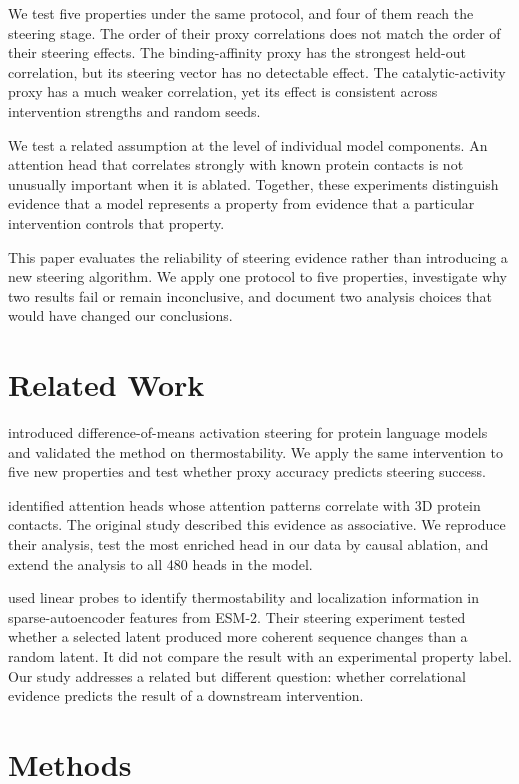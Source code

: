 \documentclass{article}
\begin{document}
We test five properties under the same protocol, and four of them reach
the steering stage. The order of their proxy correlations does not match
the order of their steering effects. The binding-affinity proxy has the
strongest held-out correlation, but its steering vector has no
detectable effect. The catalytic-activity proxy has a much weaker
correlation, yet its effect is consistent across intervention strengths
and random seeds.

We test a related assumption at the level of individual model components.
An attention head that correlates strongly with known protein contacts
is not unusually important when it is ablated. Together, these
experiments distinguish evidence that a model represents a property from
evidence that a particular intervention controls that property.

This paper evaluates the reliability of steering evidence rather than
introducing a new steering algorithm. We apply one protocol to five
properties, investigate why two results fail or remain inconclusive, and
document two analysis choices that would have changed our conclusions.

\section{Related Work}

\citet{huang2025steering} introduced difference-of-means activation
steering for protein language models and validated the method on
thermostability. We apply the same intervention to five new properties
and test whether proxy accuracy predicts steering success.

\citet{vig2021bertology} identified attention heads whose attention
patterns correlate with 3D protein contacts. The original study
described this evidence as associative. We reproduce their analysis,
test the most enriched head in our data by causal ablation, and extend
the analysis to all 480 heads in the model.

\citet{adams2025mechanistic} used linear probes to identify
thermostability and localization information in sparse-autoencoder
features from ESM-2. Their steering experiment tested whether a selected
latent produced more coherent sequence changes than a random latent. It
did not compare the result with an experimental property label. Our
study addresses a related but different question: whether correlational
evidence predicts the result of a downstream intervention.

\section{Methods}
\label{sec:method}
\end{document}
